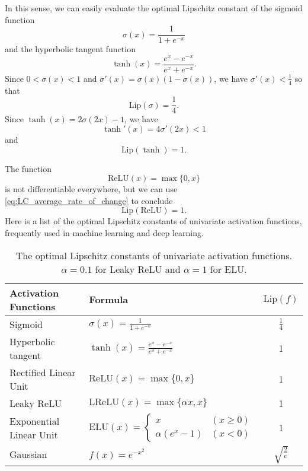\documentclass[12pt]{report}
\numberwithin{figure}{chapter}
\theoremstyle{plain}
\theoremstyle{definition}
\theoremstyle{corollary}
\theoremstyle{definition}
\theoremstyle{plain}
\theoremstyle{definition}
\theoremstyle{plain}
\newcommand\lip{\ensuremath{\text{Lip}}}
\begin{document}
In this sense, we can easily evaluate the optimal Lipschitz constant of the sigmoid function
\begin{equation}\label{eq:sigmoid}
\sigma(x)=\frac1{1+e^{-x}}
\end{equation}
and the hyperbolic tangent function
\begin{equation}\label{eq:tanh}
\tanh(x)=\frac{e^x-e^{-x}}{e^x+e^{-x}}.
\end{equation}
Since \(0<\sigma(x)<1\) and \(\sigma'(x)=\sigma(x)\left(1-\sigma(x)\right)\), we have \(\sigma'(x)<\frac14\) so that
\begin{equation}\label{eq:sigmoid_OLC}
\lip(\sigma)=\frac14.
\end{equation}
Since \(\tanh(x)=2\sigma(2x)-1\), we have
\[\tanh'(x)=4\sigma'(2x)<1\]
and
\begin{equation}\label{eq:tanh_OLC}
\lip(\tanh)=1.
\end{equation}

The  function
\begin{equation}\label{eq:ReLU}
\text{ReLU}(x)=\max\{0,x\}
\end{equation}
 is not differentiable everywhere, but we can use \eqref{eq:LC_average_rate_of_change} to conclude
\begin{equation}\label{eq:ReLU_OLC}
\lip(\text{ReLU})=1.
\end{equation}
Here is a list of the optimal Lipschitz constants of univariate activation functions, frequently used in machine learning and deep learning.
 
\renewcommand\arraystretch{1.5}
\begin{table}[ht]
\centering
\caption{The optimal Lipschitz constants of univariate activation functions.
\(\alpha=0.1\) for Leaky ReLU and \(\alpha=1\) for ELU.}
\begin{tabular}[t]{llc}
\toprule
Activation Functions	&Formula									& $\lip(f)$\\
\midrule
Sigmoid				&$\sigma(x)=\frac1{1+e^{-x}}$				&$\frac14$\\
Hyperbolic tangent	&$\tanh(x)=\frac{e^x-e^{-x}}{e^x+e^{-x}}$	&1\\
Rectified Linear Unit	&$\text{ReLU}(x)=\max\{0,x\}$			&1\\
Leaky ReLU			&$\text{LReLU}(x)=\max\{\alpha x,x\}$	&1\\
Exponential Linear Unit&$\text{ELU}(x)=
\begin{cases}x&(x\ge0)\\\alpha(e^x-1)&(x<0)\end{cases}$	&1\\
Gaussian			&$f(x)=e^{-x^2}$								&$\sqrt{\frac2e}$\\
\bottomrule
\end{tabular}
\end{table}
\end{document}
